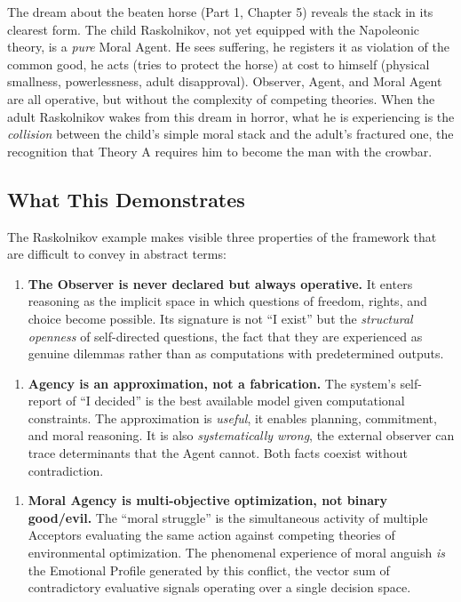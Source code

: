 The dream about the beaten horse (Part 1, Chapter 5) reveals the stack in its clearest form. The child Raskolnikov,  not yet equipped with the Napoleonic theory,  is a \emph{pure} Moral Agent. He sees suffering, he registers it as violation of the common good, he acts (tries to protect the horse) at cost to himself (physical smallness, powerlessness, adult disapproval). Observer, Agent, and Moral Agent are all operative, but without the complexity of competing theories. When the adult Raskolnikov wakes from this dream in horror, what he is experiencing is the \emph{collision} between the child's simple moral stack and the adult's fractured one,  the recognition that Theory A requires him to become the man with the crowbar.



\subsection*{What This Demonstrates}


The Raskolnikov example makes visible three properties of the framework that are difficult to convey in abstract terms:

\begin{enumerate}
\item \textbf{The Observer is never declared but always operative.} It enters reasoning as the implicit space in which questions of freedom, rights, and choice become possible. Its signature is not ``I exist'' but the \emph{structural openness} of self-directed questions,  the fact that they are experienced as genuine dilemmas rather than as computations with predetermined outputs.
\end{enumerate}


\begin{enumerate}
\item \textbf{Agency is an approximation, not a fabrication.} The system's self-report of ``I decided'' is the best available model given computational constraints. The approximation is \emph{useful},  it enables planning, commitment, and moral reasoning. It is also \emph{systematically wrong},  the external observer can trace determinants that the Agent cannot. Both facts coexist without contradiction.
\end{enumerate}


\begin{enumerate}
\item \textbf{Moral Agency is multi-objective optimization, not binary good/evil.} The ``moral struggle'' is the simultaneous activity of multiple Acceptors evaluating the same action against competing theories of environmental optimization. The phenomenal experience of moral anguish \emph{is} the Emotional Profile generated by this conflict,  the vector sum of contradictory evaluative signals operating over a single decision space.
\end{enumerate}



